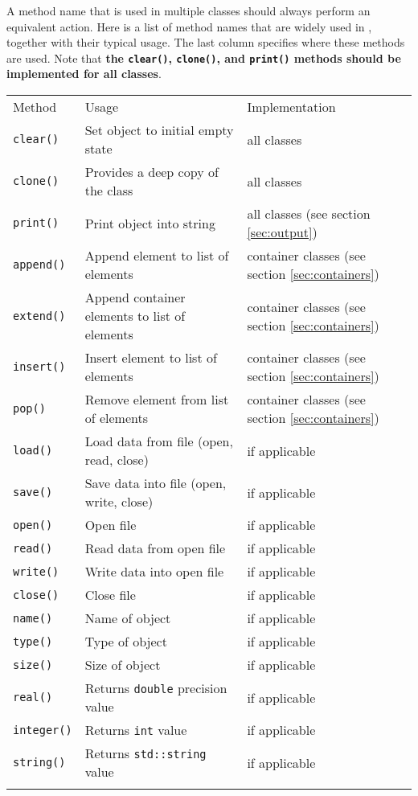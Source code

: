 \documentclass{article}[12pt,a4]
\begin{document}
A method name that is used in multiple classes should always perform an equivalent action.
Here is a list of method names that are widely used in \this, together with their typical usage.
The last column specifies where these methods are used.
Note that {\bf the {\tt clear()}, {\tt clone()}, and {\tt print()} methods should be implemented for all 
classes}.

\begin{center}
\begin{tabular}{lll}
\hline
\hline
\noalign{\smallskip}
Method & Usage & Implementation \\
\noalign{\smallskip}
\hline
\noalign{\smallskip}
{\tt clear()} & Set object to initial empty state & all classes \\
{\tt clone()} & Provides a deep copy of the class & all classes \\
{\tt print()} & Print object into string & all classes (see section \ref{sec:output}) \\
\noalign{\smallskip}
\hline
\noalign{\smallskip}
{\tt append()} & Append element to list of elements & container classes (see section \ref{sec:containers}) \\
{\tt extend()} & Append container elements to list of elements & container classes (see section \ref{sec:containers}) \\
{\tt insert()} & Insert element to list of elements & container classes (see section \ref{sec:containers}) \\
{\tt pop()} & Remove element from list of elements & container classes (see section \ref{sec:containers}) \\
\noalign{\smallskip}
\hline
\noalign{\smallskip}
{\tt load()} & Load data from file (open, read, close) & if applicable \\
{\tt save()} & Save data into file (open, write, close) & if applicable \\
{\tt open()} & Open file & if applicable \\
{\tt read()} & Read data from open file & if applicable \\
{\tt write()} & Write data into open file & if applicable \\
{\tt close()} & Close file & if applicable \\
{\tt name()} & Name of object & if applicable \\
{\tt type()} & Type of object & if applicable \\
{\tt size()} & Size of object & if applicable \\
{\tt real()} & Returns {\tt double} precision value & if applicable \\
{\tt integer()} & Returns {\tt int} value & if applicable \\
{\tt string()} & Returns {\tt std::string} value & if applicable \\
\noalign{\smallskip}
\hline
\end{tabular}
\end{center}
\end{document}
